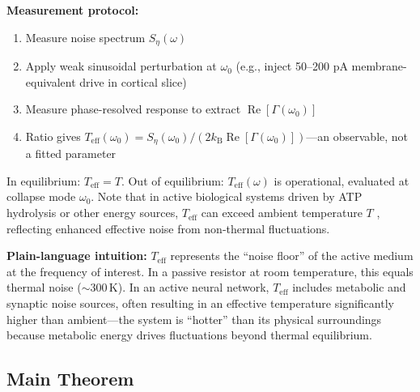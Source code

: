 \documentclass[12pt]{article}
\numberwithin{equation}{section}
\newcommand{\kB}{k_{\mathrm{B}}}
\newcommand{\Teff}{T_{\mathrm{eff}}}
\begin{document}
\textbf{Measurement protocol:}
\begin{enumerate}
\item Measure noise spectrum $S_\eta(\omega)$
\item Apply weak sinusoidal perturbation at $\omega_0$ (e.g., inject 50--200 pA membrane-equivalent drive in cortical slice)
\item Measure phase-resolved response to extract $\operatorname{Re}[\Gamma(\omega_0)]$
\item Ratio gives $\Teff(\omega_0) = S_\eta(\omega_0)/(2\kB\operatorname{Re}[\Gamma(\omega_0)])$—an observable, not a fitted parameter
\end{enumerate}

In equilibrium: $T_{\mathrm{eff}}=T$. Out of equilibrium: $T_{\mathrm{eff}}(\omega)$ is operational, evaluated at collapse mode $\omega_0$. Note that in active biological systems driven by ATP hydrolysis or other energy sources, $\Teff$ can exceed ambient temperature $T$ \cite{seifert2012}, reflecting enhanced effective noise from non-thermal fluctuations.

\textbf{Plain-language intuition:} $\Teff$ represents the ``noise floor'' of the active medium at the frequency of interest. In a passive resistor at room temperature, this equals thermal noise ($\sim 300$\,K). In an active neural network, $\Teff$ includes metabolic and synaptic noise sources, often resulting in an effective temperature significantly higher than ambient---the system is ``hotter'' than its physical surroundings because metabolic energy drives fluctuations beyond thermal equilibrium.

\subsection{Main Theorem}
\end{document}
